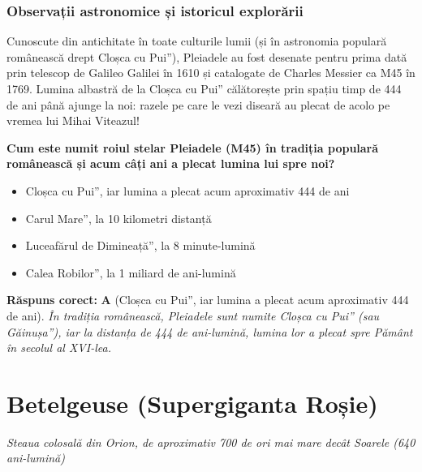 \subsubsection*{Observații astronomice și istoricul explorării}
Cunoscute din antichitate în toate culturile lumii (și în astronomia populară românească drept \quotedblbase{}Cloșca cu Pui\textquotedblright{}), Pleiadele au fost desenate pentru prima dată prin telescop de Galileo Galilei în 1610 și catalogate de Charles Messier ca M45 în 1769. Lumina albastră de la \quotedblbase{}Cloșca cu Pui\textquotedblright{} călătorește prin spațiu timp de 444 de ani până ajunge la noi: razele pe care le vezi diseară au plecat de acolo pe vremea lui Mihai Viteazul!

\vspace{6pt}
\begin{tcolorbox}[orbitarquiz, title={\textbf{Întrebare de verificare \#60: Roiul Stelar Pleiadele (\quotedblbase{}Cloșca cu Pui\textquotedblright{})}}]
\textbf{Cum este numit roiul stelar Pleiadele (M45) în tradiția populară românească și acum câți ani a plecat lumina lui spre noi?}
\begin{itemize}[leftmargin=2.2em, itemsep=2pt, topsep=4pt]
  \item[$\square$ \textbf{A.}] \quotedblbase{}Cloșca cu Pui\textquotedblright{}, iar lumina a plecat acum aproximativ 444 de ani
  \item[$\square$ \textbf{B.}] \quotedblbase{}Carul Mare\textquotedblright{}, la 10 kilometri distanță
  \item[$\square$ \textbf{C.}] \quotedblbase{}Luceafărul de Dimineață\textquotedblright{}, la 8 minute-lumină
  \item[$\square$ \textbf{D.}] \quotedblbase{}Calea Robilor\textquotedblright{}, la 1 miliard de ani-lumină
\end{itemize}
\vspace{2pt}
{\footnotesize\color{orbitarMuted}\textbf{Răspuns corect:} \textbf{A} (\quotedblbase{}Cloșca cu Pui\textquotedblright{}, iar lumina a plecat acum aproximativ 444 de ani). \emph{În tradiția românească, Pleiadele sunt numite \quotedblbase{}Cloșca cu Pui\textquotedblright{} (sau \quotedblbase{}Găinușa\textquotedblright{}), iar la distanța de 444 de ani-lumină, lumina lor a plecat spre Pământ în secolul al XVI-lea.}}
\end{tcolorbox}
\clearpage


\section{Betelgeuse (Supergiganta Roșie)}
\label{sec:body-betelgeuse}
\vspace{-4pt}
{\large\itshape\color{orbitarAccent} Steaua colosală din Orion, de aproximativ 700 de ori mai mare decât Soarele (640 ani-lumină)}\\[4pt]


